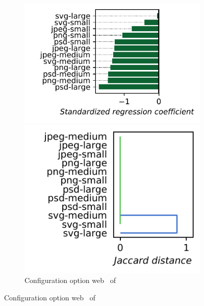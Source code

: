 \begin{figure}
	\begin{subfigure}{0.99\linewidth}
		\begin{minipage}{0.5\linewidth}
			\includegraphics[width=\linewidth]{images/plots/dconvert_web_influences.pdf}
		\end{minipage}
		\begin{minipage}{0.5\linewidth}
			\includegraphics[width=0.9\linewidth]{images/plots/dconvert_web_workloads.pdf}
		\end{minipage}
		\caption{Configuration option \guillemotleft\textsf{web}\guillemotright~ of \dconvert}
		\label{fig:results_rq3_dconvert}
	\end{subfigure}
	

\end{figure}
